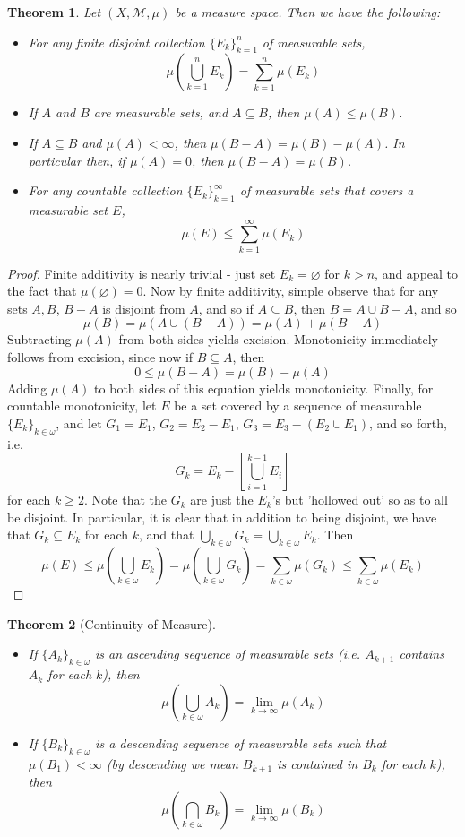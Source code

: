 \documentclass{article}
\theoremstyle{definition}
\theoremstyle{plain}
\theoremstyle{theorem}
\newtheorem{theorem}{Theorem}[section]
\begin{document}
\begin{theorem}
	Let $(X,\mathcal{M},\mu)$ be a measure space. Then we have the following:
	\begin{itemize}
	\item[Finite Additivity] For any finite disjoint collection $\{E_k\}_{k=1}^n$ of measurable sets, 
	\[ \mu \left( \bigcup_{k=1}^n E_k \right) = \sum_{k=1}^n \mu(E_k) \]
	\item[Monotonicity] If $A$ and $B$ are measurable sets, and $A \subseteq B$, then $\mu(A) \leq \mu(B)$. 
	\item[Excision] If $A \subseteq B$ and $\mu(A) < \infty$, then $\mu(B-A) = \mu(B) - \mu(A)$. In particular then, if $\mu(A) = 0$, then $\mu(B-A) = \mu(B)$.
	\item[Countable Monotonicity] For any countable collection $\{E_k\}_{k=1}^{\infty}$ of measurable sets that covers a measurable set $E$, 
	\[ \mu(E) \leq \sum_{k=1}^{\infty} \mu(E_k) \]
	\end{itemize}
\end{theorem}
\begin{proof}
	Finite additivity is nearly trivial - just set $E_k = \varnothing$ for $k > n$, and appeal to the fact that $\mu(\varnothing) = 0$. Now by finite additivity, simple observe that for any sets $A,B$, $B-A$ is disjoint from $A$, and so if $A \subseteq B$, then $B = A \cup B-A$, and so 
	\[ \mu(B) = \mu(A \cup (B-A)) =  \mu(A) + \mu(B-A) \]
Subtracting $\mu(A)$ from both sides yields excision. Monotonicity immediately follows from excision, since now if $B \subseteq A$, then 
	\[0 \leq \mu(B-A) = \mu(B)-\mu(A) \]
Adding $\mu(A)$ to both sides of this equation yields monotonicity. Finally, for countable monotonicity, let $E$ be a set covered by a sequence of measurable $\{E_k\}_{k \in \omega}$, and let $G_1 = E_1$, $G_2 = E_2-E_1$, $G_3 = E_3-(E_2 \cup E_1)$, and so forth, i.e.
	\[ G_k = E_k - \left[ \bigcup_{i=1}^{k-1} E_i \right] \]
	for each $k \geq 2$. Note that the $G_k$ are just the $E_k$'s but 'hollowed out' so as to all be disjoint. In particular, it is clear that in addition to being disjoint, we have that $G_k \subseteq E_k$ for each $k$, and that $\bigcup_{k \in \omega} G_k = \bigcup_{k \in \omega} E_k$. Then 
	\[\mu(E) \leq \mu \left( \bigcup_{k \in \omega} E_k \right) = \mu \left( \bigcup_{k \in \omega} G_k \right) = \sum_{k \in \omega} \mu(G_k) \leq \sum_{k \in \omega} \mu(E_k) \]
\end{proof}
\begin{theorem}[Continuity of Measure]
	\begin{itemize} We have the following:
		\item[(a)] If $\{A_k\}_{k \in \omega}$ is an ascending sequence of measurable sets (i.e. $A_{k+1}$ contains $A_k$ for each $k$), then 
		\[ \mu \left( \bigcup_{k \in \omega} A_k \right) = \lim_{k \to \infty} \mu(A_k) \]
		\item[(b)] If $\{B_k\}_{k\in \omega}$ is a descending sequence of measurable sets such that $\mu(B_1) < \infty$ (by descending we mean $B_{k+1}$ is contained in $B_k$ for each $k$), then 
		\[ \mu \left( \bigcap_{k \in \omega} B_k \right) = \lim_{k \to \infty} \mu(B_k) \]
	\end{itemize}
\end{theorem}
\end{document}

